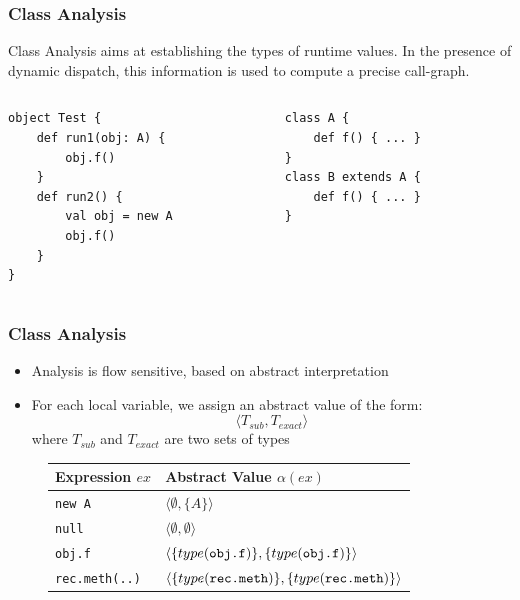 \documentclass[hyperref={pdfpagelabels=false}]{beamer}
\begin{document}
\begin{frame}[fragile]
\frametitle{Class Analysis}

    Class Analysis aims at establishing the types of runtime values. In
    the presence of dynamic dispatch, this information is used to compute a
    precise call-graph.

    \begin{columns}
      \begin{column}{0.5\textwidth}
\begin{lstlisting}
object Test {
    def run1(obj: A) {
        obj.f()
    }
    def run2() {
        val obj = new A
        obj.f()
    }
}
\end{lstlisting}
      \end{column}
      \begin{column}{0.5\textwidth}
\begin{lstlisting}
class A {
    def f() { ... }
}
class B extends A {
    def f() { ... }
}
\end{lstlisting}
      \end{column}
    \end{columns}


\end{frame}

\begin{frame}[fragile]
    \frametitle{Class Analysis}
    \begin{itemize}
        \item Analysis is flow sensitive, based on abstract interpretation
        \item For each local variable, we assign an abstract value of the form:
        $$ \langle T_{sub}, T_{exact} \rangle $$ where $T_{sub}$ and
        $T_{exact}$ are two sets of types
    \end{itemize}

\begin{figure}
    \begin{tabular}{ l | l }
        Expression $ex$       & Abstract Value $\alpha(ex)$\\
        \hline
        \verb/new A/          & $\langle \emptyset, \{ A \} \rangle$ \\
        \verb/null/           & $\langle \emptyset, \emptyset \rangle$ \\
        \verb/obj.f/          & $\langle\{type(\verb/obj.f/)\}, \{type(\verb/obj.f/)\} \rangle$ \\
        \verb/rec.meth(..)/   & $\langle\{type(\verb/rec.meth/)\}, \{type(\verb/rec.meth/)\} \rangle$ \\
    \end{tabular}
\end{figure}
\end{frame}
\end{document}
